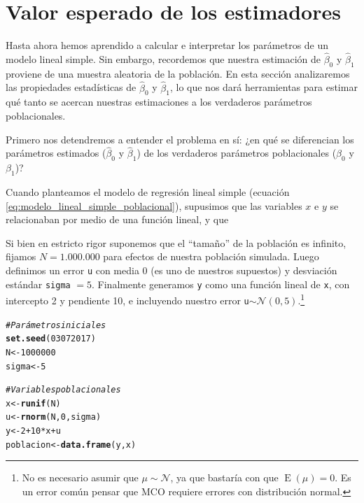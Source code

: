 \documentclass{report}\usepackage[]{graphicx}\usepackage[]{color}
\makeatletter
\newcommand{\hlnum}[1]{\textcolor[rgb]{0.686,0.059,0.569}{#1}}%
\newcommand{\hlcom}[1]{\textcolor[rgb]{0.678,0.584,0.686}{\textit{#1}}}%
\newcommand{\hlopt}[1]{\textcolor[rgb]{0,0,0}{#1}}%
\newcommand{\hlstd}[1]{\textcolor[rgb]{0.345,0.345,0.345}{#1}}%
\newcommand{\hlkwb}[1]{\textcolor[rgb]{0.69,0.353,0.396}{#1}}%
\newcommand{\hlkwd}[1]{\textcolor[rgb]{0.737,0.353,0.396}{\textbf{#1}}}%
\newenvironment{kframe}{%
 \def\at@end@of@kframe{}%
 \ifinner\ifhmode%
  \def\at@end@of@kframe{\end{minipage}}%
  \begin{minipage}{\columnwidth}%
 \fi\fi%
 \def\FrameCommand##1{\hskip\@totalleftmargin \hskip-\fboxsep
 \colorbox{shadecolor}{##1}\hskip-\fboxsep
     \hskip-\linewidth \hskip-\@totalleftmargin \hskip\columnwidth}%
 \MakeFramed {\advance\hsize-\width
   \@totalleftmargin\z@ \linewidth\hsize
   \@setminipage}}%
 {\par\unskip\endMakeFramed%
 \at@end@of@kframe}
\newenvironment{knitrout}{}{} %
\newcommand{\E}{\operatorname{E}}
\makeatother
\begin{document}





\section{Valor esperado de los estimadores}

Hasta ahora hemos aprendido a calcular e interpretar los parámetros de un modelo lineal simple. Sin embargo, recordemos que nuestra estimación de $\hat\beta_0$ y $\hat\beta_1$ proviene de una muestra aleatoria de la población.
En esta sección analizaremos las propiedades estadísticas de $\hat\beta_0$ y $\hat\beta_1$, lo que nos dará herramientas para estimar qué tanto se acercan nuestras estimaciones a los verdaderos parámetros poblacionales.

Primero nos detendremos a entender el problema en sí: ¿en qué se diferencian los parámetros estimados ($\hat\beta_0$ y $\hat\beta_1$) de los verdaderos parámetros poblacionales ($\beta_0$ y $\beta_1$)?

Cuando planteamos el modelo de regresión lineal simple (ecuación \eqref{eq:modelo_lineal_simple_poblacional}), supusimos que las variables $x$ e $y$ se relacionaban por medio de una función lineal, y que 

Si bien en estricto rigor suponemos que el ``tamaño'' de la población es infinito, fijamos $N=1.000.000$ para efectos de nuestra población simulada.
Luego definimos un error \verb|u| con media 0 (es uno de nuestros supuestos) y desviación estándar \verb|sigma| $=5$. Finalmente generamos \verb|y| como una función lineal de \verb|x|, con intercepto 2 y pendiente 10, e incluyendo nuestro error \verb|u|$\sim \mathcal{N}(0, 5)$.\footnote{No es necesario asumir que $\mu \sim \mathcal{N}$, ya que bastaría con que $\E(\mu)=0$. Es un error común pensar que MCO requiere errores con distribución normal.}

\begin{knitrout}
\color{fgcolor}\begin{kframe}
\begin{alltt}
\hlcom{# Parámetros iniciales}
\hlkwd{set.seed}\hlstd{(}\hlnum{03072017}\hlstd{)}
\hlstd{N} \hlkwb{<-} \hlnum{1000000}
\hlstd{sigma} \hlkwb{<-} \hlnum{5}

\hlcom{# Variables poblacionales}
\hlstd{x} \hlkwb{<-} \hlkwd{runif}\hlstd{(N)}
\hlstd{u} \hlkwb{<-} \hlkwd{rnorm}\hlstd{(N,} \hlnum{0}\hlstd{, sigma)}
\hlstd{y} \hlkwb{<-} \hlnum{2} \hlopt{+} \hlnum{10}\hlopt{*}\hlstd{x} \hlopt{+} \hlstd{u}
\hlstd{poblacion} \hlkwb{<-} \hlkwd{data.frame}\hlstd{(y,x)}
\end{alltt}
\end{kframe}
\end{knitrout}
\end{document}
